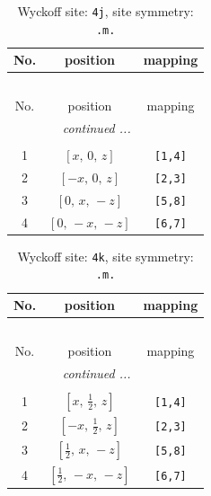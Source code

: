 \documentclass[fleqn,8pt]{jsarticle}
\begin{document}
\renewcommand{\arraystretch}{1.2}
\begin{longtable}{ccc}
\caption{Wyckoff site: {\tt 4j}, site symmetry: {\tt .m.}}
 \\
 \hline \hline
No. & position & mapping \\ \hline \endfirsthead

\multicolumn{2}{l}{\tablename\ \thetable{}} \\
 \hline \hline
No. & position & mapping \\ \hline \endhead

 \hline \hline
\multicolumn{2}{r}{\footnotesize\it continued ...} \\ \endfoot

 \hline \hline
\multicolumn{2}{r}{} \\ \endlastfoot

1 & $\left[ x,\, 0,\, z \right]$ & {\tt [1,4]} \\ \hline
2 & $\left[ - x,\, 0,\, z \right]$ & {\tt [2,3]} \\ \hline
3 & $\left[ 0,\, x,\, - z \right]$ & {\tt [5,8]} \\ \hline
4 & $\left[ 0,\, - x,\, - z \right]$ & {\tt [6,7]} \\
\end{longtable}
\renewcommand{\arraystretch}{1.2}
\begin{longtable}{ccc}
\caption{Wyckoff site: {\tt 4k}, site symmetry: {\tt .m.}}
 \\
 \hline \hline
No. & position & mapping \\ \hline \endfirsthead

\multicolumn{2}{l}{\tablename\ \thetable{}} \\
 \hline \hline
No. & position & mapping \\ \hline \endhead

 \hline \hline
\multicolumn{2}{r}{\footnotesize\it continued ...} \\ \endfoot

 \hline \hline
\multicolumn{2}{r}{} \\ \endlastfoot

1 & $\left[ x,\, \frac{1}{2},\, z \right]$ & {\tt [1,4]} \\ \hline
2 & $\left[ - x,\, \frac{1}{2},\, z \right]$ & {\tt [2,3]} \\ \hline
3 & $\left[ \frac{1}{2},\, x,\, - z \right]$ & {\tt [5,8]} \\ \hline
4 & $\left[ \frac{1}{2},\, - x,\, - z \right]$ & {\tt [6,7]} \\
\end{longtable}
\end{document}
